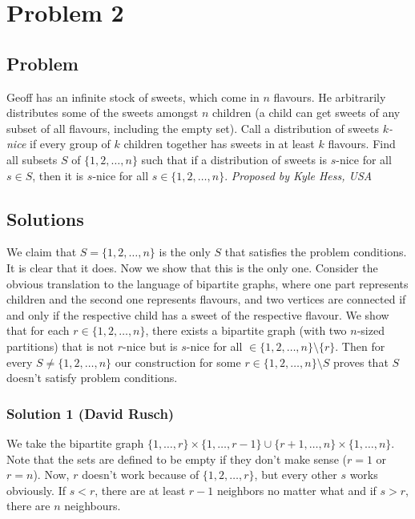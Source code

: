 \section{Problem 2}
\subsection{Problem}
Geoff has an infinite stock of sweets, which come in $n$ flavours. He arbitrarily distributes some of the sweets amongst $n$ children (a child can get sweets of any subset of all flavours, including the empty set). Call a distribution of sweets $k$\emph{-nice} if every group of $k$ children together has sweets in at least $k$ flavours. Find all subsets $S$ of $\{1,2,\dots,n\}$ such that if a distribution of sweets is $s$-nice for all $s\in S$, then it is $s$-nice for all $s\in \{1,2,\dots,n\}$.\nl
\textit{Proposed by Kyle Hess, USA}

\subsection{Solutions}
We claim that $S = \{1, 2, \dots, n\}$ is the only $S$ that satisfies the problem conditions. It is clear that it does. Now we show that this is the only one.\nl
Consider the obvious translation to the language of bipartite graphs, where one part represents children and the second one represents flavours, and two vertices are connected if and only if the respective child has a sweet of the respective flavour. We show that for each $r \in \{1, 2, \dots, n\}$, there exists a bipartite graph (with two $n$-sized partitions) that is not $r$-nice but is $s$-nice for all $\in\{1,2,\dots,n\}\setminus\{r\}$. Then for every $S\neq \{1,2,\dots,n\}$ our construction for some $r\in \{1,2,\dots,n\}\setminus S$ proves that $S$ doesn't satisfy problem conditions.

\subsubsection{Solution 1 (David Rusch)}
We take the bipartite graph $\{1,\dots, r\} \times \{1,\dots,r-1\} \cup \{r+1,\dots,n\} \times \{1,\dots,n\}$. Note that the sets are defined to be empty if they don't make sense ($r=1$ or $r=n$). Now, $r$ doesn't work because of $\{1,2,\dots,r\}$, but every other $s$ works obviously. If $s<r$, there are at least $r-1$ neighbors no matter what and if $s>r$, there are $n$ neighbours. 

